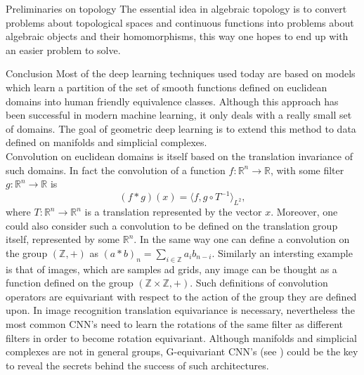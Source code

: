 \documentclass[12pt,a4paper]{report}
\theoremstyle{plain}
\theoremstyle{definition}
\theoremstyle{remark}
\newcommand{\Z}{\mathbb{Z}}
\newcommand{\R}{\mathbb{R}}
\newcommand{\scal}[2]{\langle #1, #2 \rangle}
\begin{document}
    \begin{titlepage}
        
    \end{titlepage}
    \tableofcontents
    \newpage
    \begin{chapter}{Preliminaries on topology}
        \label{ch:1}
        The essential idea in algebraic topology is to convert problems about topological spaces and continuous functions into
        problems about algebraic objects and their homomorphisms, this way one hopes to end up with an easier problem to solve. 
        
    \end{chapter}
    \newpage
    \begin{section}{Conclusion}
        Most of the deep learning techniques used today are based on models which learn a partition of the set of smooth functions defined on euclidean 
        domains into human friendly equivalence classes. Although this approach has been successful in modern machine learning, it only deals with a really 
        small set of domains. The goal of geometric deep learning is to extend this method to data defined on manifolds and simplicial complexes.\\
        Convolution on euclidean domains is itself based on the translation invariance of such domains. In fact the convolution of a function $f : \R^n \to \R$,
        with some filter $g:\R^n \to \R$ is \[(f * g)(x) = \scal{f}{g \circ T^{-1}}_{L^2},\] where $T:\R^n \to \R^n$ is a translation represented by the vector $x$.
        Moreover, one could also consider such a convolution to be defined on the translation group itself, represented by some $\R^n$. 
        In the same way one can define a convolution on the group $(\Z,+)$ as $(a * b)_n = \sum_{i \in \Z}a_i b_{n-i}$.
        Similarly an intersting example is that of images, which are samples ad grids, any image can be thought as a function defined on the group $(\Z \times \Z, +)$.
        Such definitions of convolution operators are equivariant with respect to the action of the group they are defined upon.
        In image recognition translation equivariance is necessary, nevertheless the most common CNN's need to learn the rotations of the same filter as different 
        filters in order to become rotation equivariant. Although manifolds and simplicial complexes are not in general groups, G-equivariant CNN's (see \cite{gcnn})
        could be the key to reveal the secrets behind the success of such architectures.
    \end{section}
\end{document}
